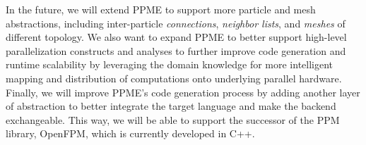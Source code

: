 In the future, we will extend PPME to support more 
particle and mesh abstractions, including inter-particle {\em connections}, {\em neighbor lists}, and {\em meshes} of different topology. We also want to expand PPME to better support 
high-level parallelization constructs and analyses to further improve code generation and 
runtime scalability by leveraging the domain knowledge for more intelligent mapping 
and distribution of computations onto underlying parallel hardware.
Finally, we will improve PPME's code generation process by adding another layer of abstraction
to better integrate the target language and make the backend exchangeable. This way, we 
will be able to support the successor of the PPM library, OpenFPM, which is currently developed in C++.


